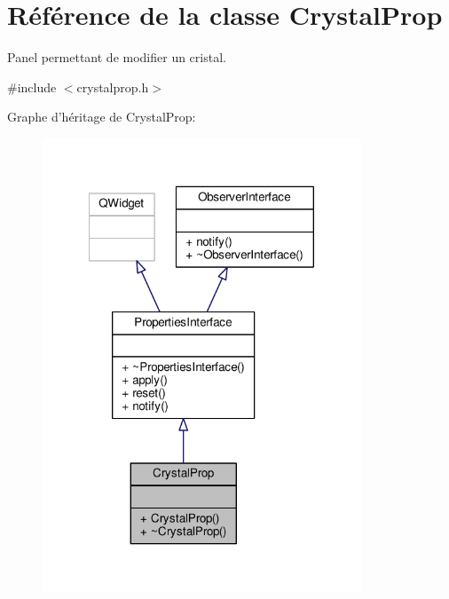 \hypertarget{classCrystalProp}{\section{Référence de la classe Crystal\+Prop}
\label{classCrystalProp}
}


Panel permettant de modifier un cristal.  




{\ttfamily \#include $<$crystalprop.\+h$>$}



Graphe d'héritage de Crystal\+Prop\+:
\nopagebreak
\begin{figure}[H]
\begin{center}
\leavevmode
\includegraphics[width=269pt]{d8/d57/classCrystalProp__inherit__graph}
\end{center}
\end{figure}


